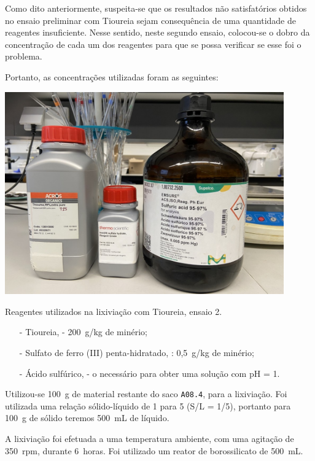 Como dito anteriormente, suspeita-se que os resultados não satisfatórios obtidos no ensaio preliminar com Tioureia sejam consequência de uma quantidade de reagentes insuficiente.
Nesse sentido, neste segundo ensaio, colocou-se o dobro da concentração de cada um dos reagentes para que se possa verificar se esse foi o problema.

Portanto, as concentrações utilizadas foram as seguintes:

\begin{marginfigure}[2.5cm]
    \centering
    \includegraphics[width=0.9\textwidth]{figures/Reagentes Tioureia.JPG}
    \caption{Reagentes utilizados na lixiviação com Tioureia, ensaio 2.}
    \label{fig:reagentes-tioureia2}
\end{marginfigure}

\begin{itemize}
    \item[-] Tioureia, \tioureia{} - 200~g/kg de minério;
    \item[-] Sulfato de ferro (III) penta-hidratado, \sulfe{}: 0,5~g/kg de minério;
    \item[-] Ácido sulfúrico, \acsul{} - o necessário para obter uma solução com pH = 1.
\end{itemize}

Utilizou-se 100~g de material restante do saco \texttt{A08.4}, para a lixiviação.
Foi utilizada uma relação sólido-líquido de 1 para 5 (S/L = 1/5), portanto para 100~g de sólido teremos 500~mL de líquido.

A lixiviação foi efetuada a uma temperatura ambiente, com uma agitação de 350~rpm, durante 6~horas.
Foi utilizado um reator de borossilicato de 500~mL.


